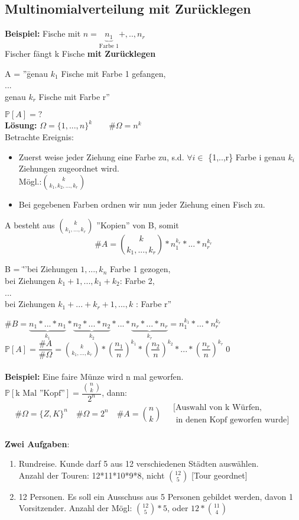 	 \subsection{Multinomialverteilung mit Zurücklegen}
 	 \textbf{Beispiel:} Fische mit $n = \underbrace{n_1}_\text{Farbe 1}+,..,n_r$\medskip\\
 	 Fischer fängt k Fische \textbf{mit Zurücklegen}
\begin{tabbing}
	 	 A = ''\= genau $k_1$ Fische mit Farbe 1 gefangen,\\
	 	 \> ...\\
	 	 \> genau $k_r$ Fische mit Farbe r''
\end{tabbing}
$\mathds{P}[A] = ?$\medskip\\
\textbf{Lösung:} $\Omega = \{1,...,n\}^k \qquad \#\Omega = n^k$\\
Betrachte Ereignis:
\begin{itemize}
	\item Zuerst weise jeder Ziehung eine Farbe zu, s.d. $\forall i \in $ \{1,..,r\} Farbe i genau $k_i$ Ziehungen zugeordnet wird.\\Mögl.:$\binom{k}{k_1,k_2,...,k_r}$
	\item Bei gegebenen Farben ordnen wir nun jeder Ziehung einen Fisch zu.
\end{itemize}
A besteht aus $\binom{k}{k_1,...,k_r}$ ''Kopien'' von B, somit
$$\#A = \binom{k}{k_1,...,k_r}*n_1^{k_r}*...*n_r^{k_r}$$
\begin{tabbing}
	B = \= ''bei Ziehungen $1,...,k_n$ Farbe 1 gezogen,\\
	\> bei Ziehungen $k_1+1,...,k_1+k_2$: Farbe 2,\\
	\>...\\
	\> bei Ziehungen $k_1+...+k_r+1,...,k$ : Farbe r''
\end{tabbing}
$\#B=\underbrace{n_1*...*n_1}_{k_1}*\underbrace{n_2*...*n_2}_{k_2}*...*\underbrace{n_r*...*n_r}_{k_r} = n_1^{k_1}*...*n_r^{k_r}$\medskip\\
$\mathds{P}[A] = \dfrac{\#A}{\#\Omega}= \binom{k}{k_1,...,k_r}*\left(\dfrac{n_1}{n}\right)^{k_1}*\left(\dfrac{n_2}{n}\right)^{k_2}*...*\left(\dfrac{n_r}{n}\right)^{k_r}$\qed\\\\
\textbf{Beispiel:} Eine faire Münze wird n mal geworfen.\medskip\\ $\mathds{P}[\text{k Mal ''Kopf''}]= \dfrac{\binom{n}{k}}{2^n}$, dann: 
$$\#\Omega = \{Z, K\}^n\quad \#\Omega = 2^n\quad \#A=\binom{n}{k} \quad \substack{\text{[Auswahl von k Würfen,}\\\text{ in denen Kopf geworfen wurde]}}$$\\
\textbf{Zwei Aufgaben}:
\begin{enumerate}
	\item Rundreise. Kunde darf 5 aus 12 verschiedenen Städten auswählen.\\Anzahl der Touren: 12*11*10*9*8, nicht $\binom{12}{5}$ [Tour geordnet]
	\item 12 Personen. Es soll ein Ausschuss aus 5 Personen gebildet werden, davon 1 Vorsitzender. Anzahl der Mögl: $\binom{12}{5}*5$, oder $12*\binom{11}{4}$\end{enumerate}
 	 
